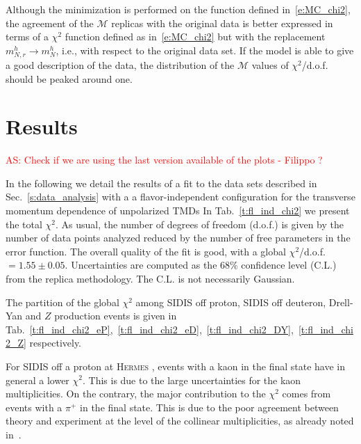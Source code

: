 \documentclass[aps,preprintnumbers,showpacs,nofootinbib,superscriptaddress,floatfix]{revtex4}
\newcommand{\hermes}{\textsc{Hermes }}
\begin{document}
Although the minimization is performed on the function defined in~\eqref{e:MC_chi2}, the agreement of the $\mathcal{M}$ replicas with the original data is better expressed in terms of a $\chi^2$ function defined as in~\eqref{e:MC_chi2} but with the replacement $m_{N, r}^{h} \to m_{N}^{h}$, i.e.,  with respect to the original data set. If the model is able to give a good description of the data, the distribution of the $\mathcal{M}$ values of $\chi^2$/d.o.f. should be peaked around one. 










\newpage
\section{Results}
\label{s:results}

\textcolor{red}{AS: Check if we are using the last version available of the plots - Filippo ?}

In the following we detail the results of a fit to the data sets described in Sec.~\ref{s:data_analysis} with a a flavor-independent configuration for the transverse momentum dependence of unpolarized TMDs
In Tab.~\ref{t:fl_ind_chi2} we present the total $\chi^2$. As usual, the number of degrees of freedom (d.o.f.) is given by the number of data points analyzed reduced by the number of free parameters in the error function. 
The overall quality of the fit is good, with a global $\chi^2$/d.o.f. $= 1.55 \pm 0.05$. Uncertainties are computed as the $68\%$ confidence level (C.L.) from the replica methodology. The C.L. is not necessarily Gaussian. 

The partition of the global $\chi^2$ among SIDIS off proton, SIDIS off deuteron, Drell-Yan and $Z$ production events is given in Tab.~\ref{t:fl_ind_chi2_eP},~\ref{t:fl_ind_chi2_eD},~\ref{t:fl_ind_chi2_DY},~\ref{t:fl_ind_chi2_Z} respectively. 

For SIDIS off a proton at \hermes, events with a kaon in the final state have in general a lower $\chi^2$. This is due to the large uncertainties for the kaon multiplicities. On the contrary, the major contribution to the $\chi^2$ comes from events with a $\pi^+$ in the final state. This is due to the poor agreement between theory and experiment at the level of the collinear multiplicities, as already noted in~\cite{Signori:2013mda,Signori:2013gra}.
\end{document}
